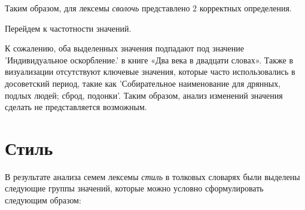 Таким образом, для лексемы \textit{сволочь} представлено 2 корректных определения.

Перейдем к частотности значений.

К сожалению, оба выделенных значения подпадают под значение ’Индивидуальное оскорбление.’
в книге «Два века в двадцати словах».
Также в визуализации отсутствуют ключевые значения,
которые часто использовались в досоветский период, такие как ’Собирательное наименование для дрянных, подлых людей; сброд, подонки’.
Таким образом, анализ изменений значения сделать не представляется возможным.

\section*{Стиль}

В результате анализа семем лексемы \textit{стиль} в толковых словарях были выделены следующие группы значений,
которые можно условно сформулировать следующим образом:

